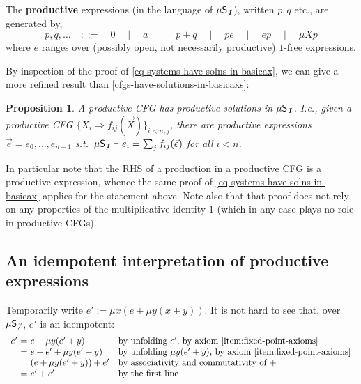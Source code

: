 \documentclass[a4paper,10pt]{amsart}
\newcommand{\defname}[1]{\textbf{{#1}}}
\newtheorem{proposition}[theorem]{Proposition}
\theoremstyle{definition}
\newcommand{\proves}{\vdash}
\newcommand{\basicax}{\mu\mathsf{S}}
\newcommand{\basicaxidfree}{\basicax_{\not {\hspace{.1em}1}}}
\begin{document}
The \defname{productive} expressions (in the language of $\basicaxidfree$), written $p,q$ etc., are generated by,
\begin{equation}
    \label{eq:productive-expressions}
    p,q,\dots \quad ::= \quad 0 \quad \mid \quad a 
\quad \mid \quad p+q 
\quad \mid \quad pe \quad \mid \quad ep
\quad \mid \quad \mu X p
\end{equation}
where $e$ ranges over (possibly open, not necessarily productive) $1$-free expressions.

By inspection of the proof of \cref{eq-systems-have-solns-in-basicax}, we can give a more refined result than \cref{cfgs-have-solutions-in-basicaxs}:

\begin{proposition}
\label{prod-cfg-has-prod-solns}
    A productive CFG has productive solutions in $\basicaxidfree$.
    I.e., given a productive CFG $\{X_i \Rightarrow f_{ij}(\vec X)\}_{i<n,j}$, there are productive expressions $\vec e = e_0, \dots, e_{n-1}$ s.t.\ $\basicaxidfree \proves e_i = \sum_j f_{ij}(\vec e)$ for all $i<n$.
\end{proposition}
In particular note that the RHS of a production in a productive CFG is a productive expression, whence the same proof of \cref{eq-systems-have-solns-in-basicax} applies for the statement above.
Note also that that proof does not rely on any properties of the multiplicative identity $1$ (which in any case plays no role in productive CFGs).

\subsection{An idempotent interpretation of productive expressions}

Temporarily write $e':= \mu x (e + \mu y (x + y))$. 
It is not hard to see that, over $\basicaxidfree$, $e'$ is an idempotent:
\[
\begin{array}{r@{\ = \ }ll}
      e'  & e + \mu y (e' + y) & \text{by unfolding $e'$, by axiom \eqref{item:fixed-point-axioms}} \\
        & e + e' + \mu y (e' + y) & \text{by unfolding $\mu y (e' + y)$, by axiom \eqref{item:fixed-point-axioms}} \\
        & (e + \mu y (e' + y) ) + e' & \text{by associativity and commutativity of $+$}\\
        & e' + e' & \text{by the first line}
\end{array}
\]
\end{document}
